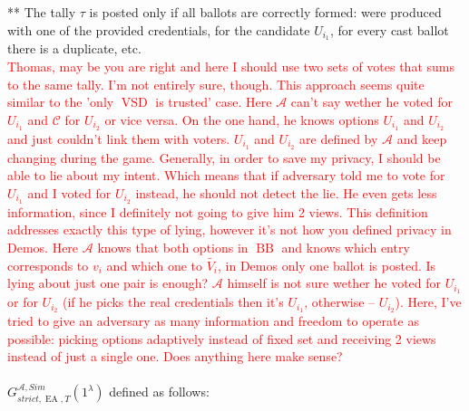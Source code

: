 \documentclass[12pt]{article}
\DeclareMathOperator{\vsd}{VSD}
\DeclareMathOperator{\ea}{EA}
\DeclareMathOperator{\bb}{BB}
\begin{document}
** The tally $\tau$ is posted only if all ballots are correctly formed: were produced with one of the provided credentials, for the candidate $U_{i_1}$, for every cast ballot there is a duplicate, etc. \\
\textcolor{red}{Thomas, may be you are right and here I should use two sets of votes that sums to the same tally. I'm not entirely sure, though. This approach seems quite similar to the 'only $\vsd$ is trusted' case.  Here $\mathcal{A}$ can't say wether he voted for $U_{i_1}$ and $\mathcal{C}$ for $U_{i_2}$ or vice versa. On the one hand, he knows options $U_{i_1}$  and $U_{i_2}$ and just couldn't link them with voters.  $U_{i_1}$ and $U_{i_2}$ are defined by $\mathcal{A}$ and keep changing during the game. Generally, in order to save my privacy, I should be able to lie about my intent. Which means that if adversary told me to vote for  $U_{i_1}$  and I voted for $U_{i_2}$ instead, he should not detect the lie. He even gets less information, since I definitely not going to give him 2 views. This definition addresses exactly this type of lying, however it's not how you defined privacy in Demos. Here $\mathcal{A}$ knows that both options in $\bb$ and knows which entry corresponds to $v_i$ and which one to $\tilde{V_i}$, in Demos only one ballot is posted. Is lying about just one pair is enough? $\mathcal{A}$ himself is not sure wether he voted for $U_{i_1}$ or  for $U_{i_2}$ (if he picks the real credentials then it's $U_{i_1}$, otherwise --  $U_{i_2}$). Here, I've tried to give an adversary as many information and freedom to operate as possible: picking options adaptively instead of fixed set and receiving 2 views instead of just a single one. Does anything here make sense?}
\\\\
 $G_{strict,\ea,T}^{\mathcal{A}, Sim}(1^{\lambda})$ defined as follows:\\
\end{document}

